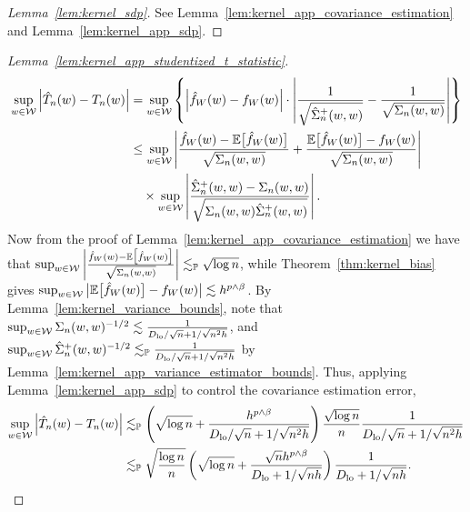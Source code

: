 \begin{proof}[Lemma~\ref{lem:kernel_sdp}]
  See Lemma~\ref{lem:kernel_app_covariance_estimation}
  and Lemma~\ref{lem:kernel_app_sdp}.
\end{proof}

\begin{proof}[Lemma~\ref{lem:kernel_app_studentized_t_statistic}]
  \begin{align*}
    \sup_{w \in \mathcal{W}}
    \left| \hat T_n(w) - T_n(w) \right|
    &=
    \sup_{w \in \mathcal{W}}
    \left\{
      \left|
      \hat f_W(w) - f_W(w)
      \right|
      \cdot
      \left|
      \frac{1}
      {\sqrt{\hat\Sigma_n^+(w,w)}}
      -
      \frac{1}{\sqrt{\Sigma_n(w,w)}}
      \right|
    \right\} \\
    &\leq
    \sup_{w \in \mathcal{W}}
    \left|
    \frac{\hat f_W(w) - \mathbb{E}\big[\hat f_W(w)\big]}
    {\sqrt{\Sigma_n(w,w)}}
    + \frac{\mathbb{E}\big[\hat f_W(w)\big] - f_W(w)}
    {\sqrt{\Sigma_n(w,w)}}
    \right| \\
    &\quad\times
    \sup_{w \in \mathcal{W}}
    \left|
    \frac{\hat\Sigma_n^+(w,w) - \Sigma_n(w,w)}
    {\sqrt{\Sigma_n(w,w) \hat\Sigma_n^+(w,w)}}
    \right|.
  \end{align*}
  Now from the proof of Lemma~\ref{lem:kernel_app_covariance_estimation} we
  have that
  $\sup_{w \in \mathcal{W}} \left|
  \frac{\hat f_W(w) - \mathbb{E}\big[\hat f_W(w)\big]}
  {\sqrt{\Sigma_n(w,w)}} \right|
  \lesssim_{\mathbb{P}} \sqrt{\log n}$,
  while Theorem~\ref{thm:kernel_bias} gives
  $\sup_{w \in \mathcal{W}} \big| \mathbb{E}\big[\hat f_W(w)\big] - f_W(w) \big|
  \lesssim h^{p \wedge \beta}$.
  By Lemma~\ref{lem:kernel_variance_bounds},
  note that
  $\sup_{w \in \mathcal{W}} \Sigma_n(w,w)^{-1/2}
  \lesssim \frac{1}{D_{\textup{lo}}/\sqrt{n} + 1/\sqrt{n^2h}}$, and
  $\sup_{w \in \mathcal{W}} \hat \Sigma_n^+(w,w)^{-1/2}
  \lesssim_{\mathbb{P}} \frac{1}{D_{\textup{lo}}/\sqrt{n} + 1/\sqrt{n^2h}}$
  by Lemma~\ref{lem:kernel_app_variance_estimator_bounds}.
  Thus, applying Lemma~\ref{lem:kernel_app_sdp} to control the
  covariance estimation error,
  \begin{align*}
    \sup_{w \in \mathcal{W}}
    \left| \hat T_n(w) - T_n(w) \right|
    &\lesssim_{\mathbb{P}}
    \left(
      \sqrt{\log n} + \frac{h^{p \wedge \beta}}{D_{\textup{lo}}/\sqrt{n} + 1/\sqrt{n^2h}}
    \right)
    \frac{\sqrt{\log n}}{n}
    \frac{1}{D_{\textup{lo}}/\sqrt{n} + 1/\sqrt{n^2h}} \\
    &\lesssim_{\mathbb{P}}
    \sqrt{\frac{\log n}{n}}
    \left(
      \sqrt{\log n} + \frac{\sqrt n h^{p \wedge \beta}}
      {D_{\textup{lo}} + 1/\sqrt{n h}}
    \right)
    \frac{1}{D_{\textup{lo}} + 1/\sqrt{n h}}.
  \end{align*}
\end{proof}

